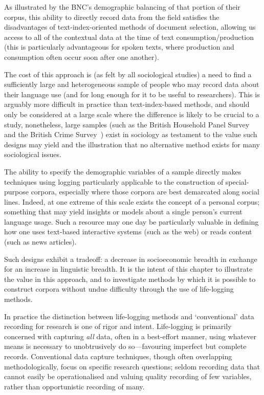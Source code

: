 As illustrated by the BNC's demographic balancing of that portion of their corpus, this ability to directly record data from the field satisfies the disadvantages of text-index-oriented methods of document selection, allowing us access to all of the contextual data at the time of text consumption/production (this is particularly advantageous for spoken texts, where production and consumption often occur soon after one another).

The cost of this approach is (as felt by all sociological studies) a need to find a sufficiently large and heterogeneous sample of people who may record data about their language use (and for long enough for it to be useful to researchers).  This is arguably more difficult in practice than text-index-based methods, and should only be considered at a large scale where the difference is likely to be crucial to a study, nonetheless, large samples (such as the British Household Panel Survey~\cite{taylor1996british} and the British Crime Survey~\cite{hough1983british}) exist in sociology as testament to the value such designs may yield and the illustration that no alternative method exists for many sociological issues.

The ability to specify the demographic variables of a sample directly makes techniques using logging particularly applicable to the construction of special-purpose corpora, especially where those corpora are best demarcated along social lines.  Indeed, at one extreme of this scale exists the concept of a personal corpus; something that may yield insights or models about a single person's current language usage.  Such a resource may one day be particularly valuable in defining how one uses text-based interactive systems (such as the web) or reads content (such as news articles).

Such designs exhibit a tradeoff: a decrease in socioeconomic breadth in exchange for an increase in linguistic breadth.  It is the intent of this chapter to illustrate the value in this approach, and to investigate methods by which it is possible to construct corpora without undue difficulty through the use of life-logging methods.




In practice the distinction between life-logging methods and `conventional' data recording for research is one of rigor and intent.  Life-logging is primarily concerned with capturing \textsl{all} data, often in a best-effort manner, using whatever means is necessary to unobtrusively do so---favouring imperfect but complete records.  Conventional data capture techniques, though often overlapping methodologically, focus on specific research questions; seldom recording data that cannot easily be operationalised and valuing quality recording of few variables, rather than opportunistic recording of many.



